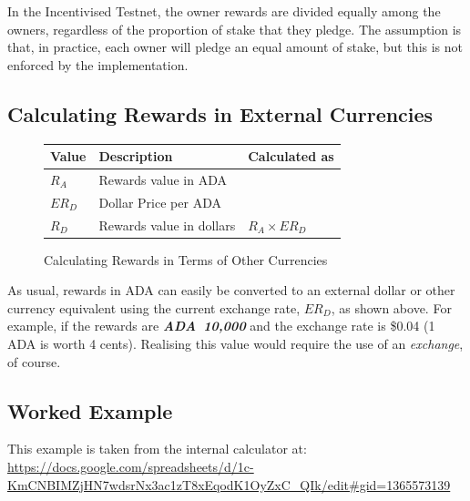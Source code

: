 \documentclass[11pt,a4paper,dvipsnames,twosided,final]{article}
\newcommand{\ada}{ADA{}}
\newcommand{\ADA}[1]{\textbf{\emph{\ada~{#1}}}}
\begin{document}
\noindent
In the Incentivised Testnet, the owner rewards are divided equally among the
owners, regardless of the proportion of stake that they pledge.  The assumption
is that, in practice, each owner will pledge an equal amount of stake, but this
is not enforced by the implementation.

\subsection{Calculating Rewards in External Currencies}
\label{sec:conversion}

\begin{figure}[h!]
\begin{center}
\begin{tabular}{||l|p{6cm}|l||}
  \hline \hline
\textbf{Value} & \textbf{Description} & \textbf{Calculated as} \\\hline
$R_A$ &  Rewards value in \ada{} &\\\hline
$ER_D$ &  Dollar Price per \ada{} &\\\hline
$R_D$ &  Rewards value in dollars & $R_A \times ER_D$ \\\hline
\hline
\end{tabular}
\end{center}
\caption{Calculating Rewards in Terms of Other Currencies}
\label{fig:monetary}
\end{figure}

\noindent
As usual, rewards in \ada{} can easily be converted to an external dollar or other currency equivalent using
the current exchange rate, $ER_D$, as shown %
above.  For example, if the rewards are \ADA{10,000} and the exchange rate is
\$0.04 (1 \ada{} is worth 4 cents).  Realising this value would require the use of an \emph{exchange},
of course.

\clearpage
\subsection{Worked Example}


This example is taken from the \IOHK{} internal calculator at:
\url{https://docs.google.com/spreadsheets/d/1c-KmCNBIMZjHN7wdsrNx3ac1zT8xEqodK1OyZxC_QIk/edit#gid=1365573139}
\end{document}
